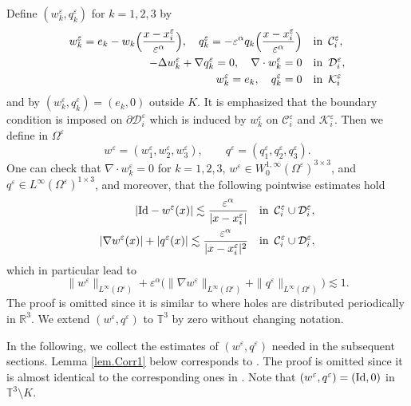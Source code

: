 \documentclass[11pt,a4paper]{article}
\numberwithin{equation}{section}
\newcommand{\R}{\mathbb{R}}
\newcommand{\T}{\mathbb{T}}
\newcommand{\eps}{\varepsilon}
\begin{document}
Define $(w^\eps_k,q_k^\eps)$ for $k=1,2,3$ by 
\[
    \begin{split}
    w^\eps_k = e_k - w_k\Big(\frac{x-x^\eps_i}{\eps^\alpha}\Big),
    \quad
    q_k^\eps = -\eps^\alpha q_k\Big(\frac{x-x^\eps_i}{\eps^\alpha}\Big)
    \quad &\text{in} \mkern9mu \mathcal{C}^\eps_i,\\
    -\Delta w^\eps_k + \nabla q_k^\eps = 0,
    \quad
    \nabla\cdot w^\eps_k = 0
    \quad &\text{in} \mkern9mu \mathcal{D}^\eps_i,\\
    w^\eps_k = e_k,
    \quad
    q_k^\eps = 0
    \quad &\text{in} \mkern9mu \mathcal{K}^\eps_i
    \end{split}
\]
and by $(w^\eps_k,q_k^\eps)=(e_k,0)$ outside $K$. It is emphasized that the boundary condition is imposed on $\partial \mathcal{D}^\eps_i$ which is induced by $w^\eps_k$ on $\mathcal{C}^\eps_i$ and $\mathcal{K}^\eps_i$. Then we define in $\Omega^\eps$
\begin{equation}\label{Corr}
    w^\eps = (w_1^\eps, w_2^\eps, w_3^\eps), 
    \qquad
    q^\eps = (q_1^\eps, q_2^\eps, q_3^\eps).
\end{equation}
One can check that 
$\nabla\cdot w^\eps_k=0$ for $k=1,2,3$, 
$w^\eps\in W^{1,\infty}_0(\Omega^\eps)^{3\times3}$, 
and $q^\eps\in L^{\infty}(\Omega^\eps)^{1\times3}$, 
and moreover, that the following pointwise estimates hold
\[
    \begin{split}
    |{\rm Id} - w^\eps(x)|
    \lesssim
    \frac{\eps^{\alpha}}{|x-x^\eps_i|}
    \quad &\text{in} \mkern9mu \mathcal{C}^\eps_i \cup \mathcal{D}^\eps_i,\\
    |\nabla w^\eps(x)| + |q^\eps(x)|
    \lesssim
    \frac{\eps^{\alpha}}{|x-x^\eps_i|^2}
    \quad &\text{in} \mkern9mu \mathcal{C}^\eps_i \cup \mathcal{D}^\eps_i, 
    \end{split}
\]
which in particular lead to
\[
    \|w^\eps\|_{L^\infty(\Omega^\eps)}
    + \eps^\alpha \big(\|\nabla w^\eps\|_{L^\infty(\Omega^\eps)} + \|q^\eps\|_{L^\infty(\Omega^\eps)}\big)
    \lesssim
    1.
\]
The proof is omitted since it is similar to \cite[Proof of Lemma 2.1 (i)]{Hof23} where holes are distributed periodically in $\R^3$. We extend $(w^\eps, q^\eps)$ to $\T^3$ by zero without changing notation.


In the following, we collect the estimates of $(w^\eps, q^\eps)$ needed in the subsequent sections. Lemma \ref{lem.Corr1} below corresponds to \cite[Lemma 2.2 (ii), (iii)]{Hof23}. The proof is omitted since it is almost identical to the corresponding ones in \cite{Hof23}. Note that $(w^\eps, q^\eps)=({\rm Id},0)$ in $\T^3\setminus K$. 
\end{document}
